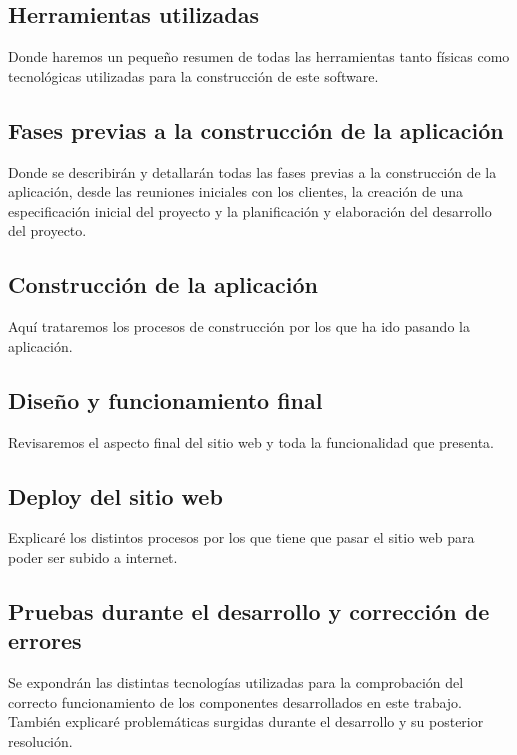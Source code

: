 \subsection{Herramientas utilizadas}

Donde haremos un pequeño resumen de todas las herramientas tanto físicas como tecnológicas utilizadas para la construcción de este software.

\subsection{Fases previas a la construcción de la aplicación}

Donde se describirán y detallarán todas las fases previas a la construcción de la aplicación, desde las reuniones iniciales con los clientes, la creación de una especificación inicial del proyecto y la planificación y elaboración del desarrollo del proyecto.

\subsection{Construcción de la aplicación}

Aquí trataremos los procesos de construcción por los que ha ido pasando la aplicación.

\subsection{Diseño y funcionamiento final}

Revisaremos el aspecto final del sitio web y toda la funcionalidad que presenta.

\subsection{Deploy del sitio web}

Explicaré los distintos procesos por los que tiene que pasar el sitio web para poder ser subido a internet.

\subsection{Pruebas durante el desarrollo y corrección de errores}

Se expondrán las distintas tecnologías utilizadas para la comprobación del correcto funcionamiento de los componentes desarrollados en este trabajo. También explicaré problemáticas surgidas durante el desarrollo y su posterior resolución.


